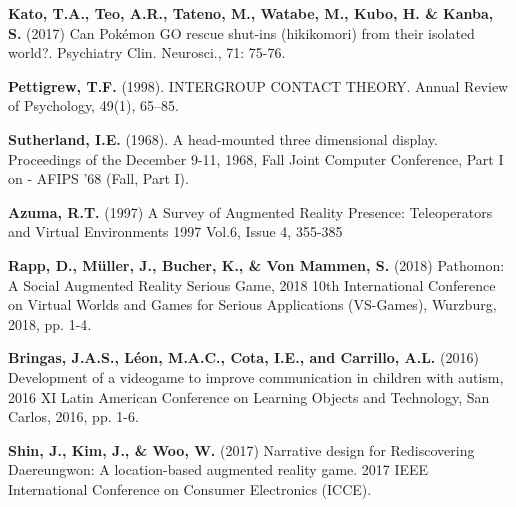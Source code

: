 \documentclass[runningheads]{llncs}
\begin{document}
\begin{thebibliography}{8}
 \textbf{Kato, T.A., Teo, A.R., Tateno, M., Watabe, M., Kubo, H. \& Kanba, S.} (2017) Can Pokémon GO rescue shut-ins (hikikomori) from their isolated world?. Psychiatry Clin. Neurosci., 71: 75-76. 

 \textbf{Pettigrew, T.F.} (1998). INTERGROUP CONTACT THEORY. Annual Review of Psychology, 49(1), 65–85. 

 \textbf{Sutherland, I.E.} (1968). A head-mounted three dimensional display. Proceedings of the December 9-11, 1968, Fall Joint Computer Conference, Part I on - AFIPS ’68 (Fall, Part I). 

 \textbf{Azuma, R.T.} (1997) A Survey of Augmented Reality
Presence: Teleoperators and Virtual Environments 1997 Vol.6, Issue 4, 355-385 

 \textbf{Rapp, D., Müller, J., Bucher, K., \& Von Mammen, S.} (2018) Pathomon: A Social Augmented Reality Serious Game, 2018 10th International Conference on Virtual Worlds and Games for Serious Applications (VS-Games), Wurzburg, 2018, pp. 1-4. 

 \textbf{Bringas, J.A.S., Léon, M.A.C., Cota, I.E., and Carrillo, A.L.} (2016) Development of a videogame to improve communication in children with autism, 2016 XI Latin American Conference on Learning Objects and Technology, San Carlos, 2016, pp. 1-6. 



 \textbf{ Shin, J., Kim, J., \& Woo, W.} (2017) Narrative design for Rediscovering Daereungwon: A location-based augmented reality game. 2017 IEEE International Conference on Consumer Electronics (ICCE). 


\end{thebibliography}
\end{document}
